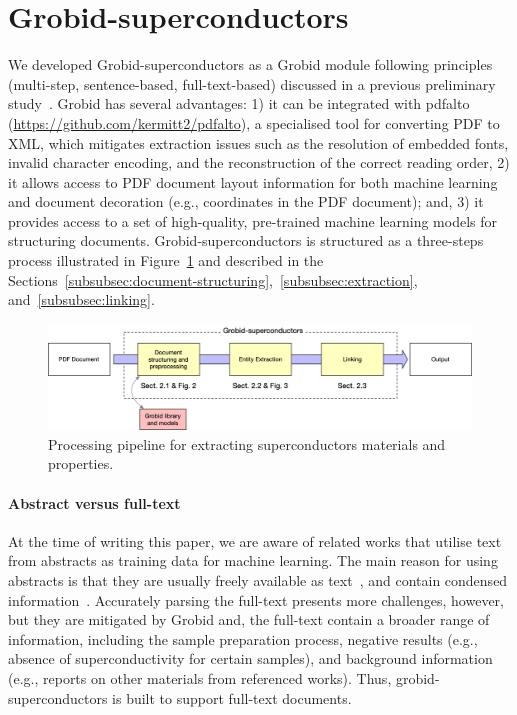 \documentclass[]{interact}
\theoremstyle{plain}%
\theoremstyle{definition}
\theoremstyle{remark}
\begin{document}
\section{Grobid-superconductors}

We developed Grobid-superconductors as a Grobid module following principles (multi-step, sentence-based, full-text-based) discussed in a previous preliminary study~\cite{foppiano:hal-02870896}.
Grobid has several advantages: 1) it can be integrated with pdfalto (\url{https://github.com/kermitt2/pdfalto}), a specialised tool for converting PDF to XML, which mitigates extraction issues such as the resolution of embedded fonts, invalid character encoding, and the reconstruction of the correct reading order, 2) it allows access to PDF document layout information for both machine learning and document decoration (e.g., coordinates in the PDF document); and, 3) it provides access to a set of high-quality, pre-trained machine learning models for structuring documents.
Grobid-superconductors is structured as a three-steps process illustrated in Figure~\ref{fig:pipeline-overview} and described in the Sections~\ref{subsubsec:document-structuring},~\ref{subsubsec:extraction}, and~\ref{subsubsec:linking}.

\begin{figure}[ht]
    \includegraphics[width=\textwidth]{schema-architecture-colors}
    \caption{Processing pipeline for extracting superconductors materials and properties. }
    \label{fig:pipeline-overview}
\end{figure}

\paragraph*{Abstract versus full-text}
At the time of writing this paper, we are aware of related works that utilise text from abstracts as training data for machine learning.
The main reason for using abstracts is that they are usually freely available as text~\cite{kononova_text-mined_2019}, and contain condensed information~\cite{yamaguchi-etal-2020-sc, court_magnetic_2020}.
Accurately parsing the full-text presents more challenges, however, but they are mitigated by Grobid and, the full-text contain a broader range of information, including the sample preparation process, negative results (e.g., absence of superconductivity for certain samples), and background information (e.g., reports on other materials from referenced works).
Thus, grobid-superconductors is built to support full-text documents.
\end{document}
